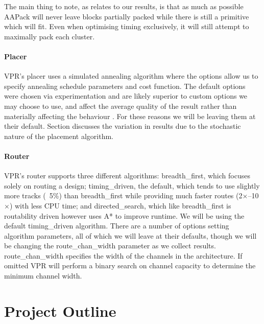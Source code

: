 \documentclass[12pt,final,oneside]{dwThesis} %
\begin{document}
   The main thing to
   note, as relates to our results, is that as much as possible AAPack will
   never leave blocks partially packed while there is still a primitive
   which will fit. Even when optimising timing exclusively, it will still
   attempt to maximally pack each cluster.

   \subsubsection{Placer} \gls{VPR}'s placer uses a simulated annealing
   algorithm where the options allow us to specify annealing schedule
   parameters and cost function. The default options were chosen via
   experimentation and are likely superior to custom options we may choose to
   use, and affect the average quality of the result rather than materially
   affecting the behaviour \cite{VPRManual, VPRBook}. For these reasons we will
   be leaving them at their default.  Section  discusses the
   variation in results due to the stochastic nature of the placement
   algorithm.  \subsubsection{Router} \gls{VPR}'s router supports three
   different algorithms: breadth\_first, which
   focuses solely on routing a design; timing\_driven, the default, which tends
   to use slightly more tracks (~5\%) than breadth\_first while providing much
   faster routes (2$\times$--10$\times$) with less CPU time; and
   directed\_search, which like breadth\_first is routability driven however
   uses A* to improve runtime. We will be using the default timing\_driven
   algorithm. There are a number of options setting
   algorithm parameters, all of which we will leave at their defaults, though
   we will be changing the route\_chan\_width parameter as we collect results.
   route\_chan\_width specifies the width of the channels in the architecture.
   If omitted \gls{VPR} will perform a binary search on channel capacity to
   determine the minimum channel width.


   \chapter{Project Outline}
\end{document}
